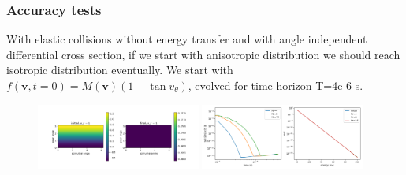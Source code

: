 \documentclass[mathserif, aspectratio=169]{beamer}
\newcommand{\vect}[1]{\boldsymbol{#1}}
\begin{document}
\begin{frame}
	\frametitle{Accuracy tests}
	With elastic collisions without energy transfer and with angle independent differential cross section, if we start with anisotropic distribution we should reach isotropic distribution eventually. We start with $f(\vect{v},t=0) = M(\vect{v}) (1 + \tan v_\theta)$, evolved for time horizon T=4e-6 s.
	\begin{figure}
		\includegraphics[width=0.48\textwidth]{figures/m_no_e_loss_aiso_test_1ev_4e-6_l2_const_r.png}
		\includegraphics[width=0.48\textwidth]{figures/m_no_e_loss_aiso_test_1ev_4e-6_l2.png}
	\end{figure}
\end{frame}
\end{document}
